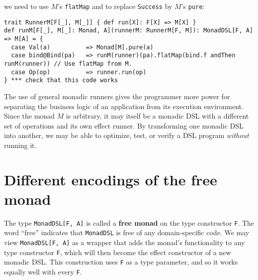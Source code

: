 we need to use $M$\textsf{'}s \lstinline!flatMap!
and to replace \lstinline!Success!
by $M$\textsf{'}s \lstinline!pure!:
\begin{lstlisting}
trait RunnerM[F[_], M[_]] { def run[X]: F[X] => M[X] }
def runM[F[_], M[_]: Monad, A](runnerM: RunnerM[F, M]): MonadDSL[F, A] => M[A] = {
  case Val(a)          => Monad[M].pure(a)
  case bind@Bind(pa)   => runM(runner)(pa).flatMap(bind.f andThen runM(runner)) // Use flatMap from M.
  case Op(op)          => runner.run(op)
} *** check that this code works
\end{lstlisting}
The use of general monadic runners gives the programmer more power
for separating the business logic of an application from its execution
environment. Since the monad $M$ is arbitrary, it may itself be a
monadic DSL with a different set of operations and its own effect
runner. By transforming one monadic DSL into another, we may be able
to optimize, test, or verify a DSL program \emph{without} running
it.

\section{Different encodings of the free monad}

The type \lstinline!MonadDSL[F, A]!
is called a \textbf{free monad} on the type constructor
\lstinline!F!. The word
\textsf{``}free\textsf{''} indicates that \lstinline!MonadDSL!
is free of any domain-specific code. We may view \lstinline!MonadDSL[F, A]!
as a wrapper that adds the monad\textsf{'}s functionality to any type constructor
\lstinline!F!, which will
then become the effect constructor of a new monadic DSL. This construction
uses \lstinline!F! as a
type parameter, and so it works equally well with every \lstinline!F!. 


